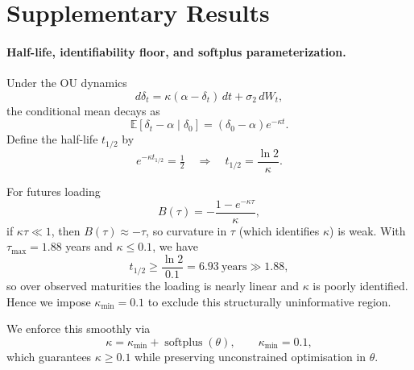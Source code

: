 \documentclass[11pt, a4paper]{article}
\begin{document}
\section{Supplementary Results}
\label{app:supplementary}

\paragraph{Half-life, identifiability floor, and softplus parameterization.}
Under the OU dynamics
\[
d\delta_t=\kappa(\alpha-\delta_t)\,dt+\sigma_2\,dW_t,
\]
the conditional mean decays as
\[
\mathbb{E}[\delta_t-\alpha\mid \delta_0]=(\delta_0-\alpha)e^{-\kappa t}.
\]
Define the half-life \(t_{1/2}\) by
\[
e^{-\kappa t_{1/2}}=\tfrac12
\quad\Rightarrow\quad
t_{1/2}=\frac{\ln 2}{\kappa}.
\]

For futures loading
\[
B(\tau)=-\frac{1-e^{-\kappa\tau}}{\kappa},
\]
if \(\kappa\tau\ll 1\), then \(B(\tau)\approx-\tau\), so curvature in \(\tau\) (which identifies \(\kappa\)) is weak.  
With \(\tau_{\max}=1.88\) years and \(\kappa\le 0.1\), we have
\[
t_{1/2}\ge \frac{\ln 2}{0.1}=6.93\ \text{years}\gg 1.88,
\]
so over observed maturities the loading is nearly linear and \(\kappa\) is poorly identified.  
Hence we impose \(\kappa_{\min}=0.1\) to exclude this structurally uninformative region.

We enforce this smoothly via
\[
\kappa=\kappa_{\min}+\operatorname{softplus}(\theta),\qquad \kappa_{\min}=0.1,
\]
which guarantees \(\kappa\ge 0.1\) while preserving unconstrained optimisation in \(\theta\).
\end{document}
